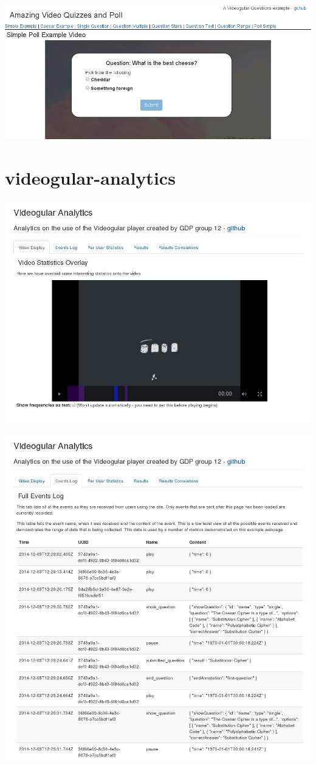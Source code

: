 \includegraphics[width=\textwidth]{screenshots/videogular-questions-example-poll-simple.png}

\section{videogular-analytics}

\includegraphics[width=\textwidth]{screenshots/videogular-analytics-video.png}

\includegraphics[width=\textwidth]{screenshots/videogular-analytics-events.png}

